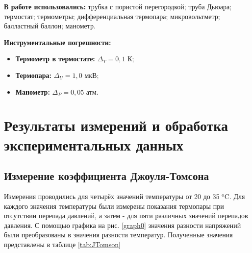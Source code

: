 \documentclass[a4paper,12pt]{article} %
\begin{document}
\textbf{В работе использовались:} трубка с пористой перегородкой; труба Дьюара; термостат; термометры; дифференциальная термопара; микровольтметр; балластный баллон; манометр.

\textbf{Инструментальные погрешности:}

\begin{itemize}
    \item \textbf{Термометр в термостате:} $\Delta_T = 0,1$ К;
    \item \textbf{Термопара:} $\Delta_U = 1,0$ мкВ;
    \item \textbf{Манометр:} $\Delta_P = 0,05$ атм.
\end{itemize}

\section{Результаты измерений и обработка экспериментальных данных}

\subsection{Измерение коэффициента Джоуля-Томсона}

Измерения проводились для четырёх значений температуры от 20 до 35 $^\text{o}$C. Для каждого значения температуры были измерены показания термопары при отсутствии перепада давлений, а затем - для пяти различных значений перепадов давления. С помощью графика на рис. \ref{graph0} значения разности напряжений были преобразованы в значения разности температур. Полученные значения представлены в таблице \ref{tab:JTomson}
\end{document}
